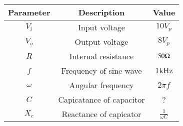  \begin{tabular}{|c|c|c|}
        \hline
        \textbf{Parameter} & \textbf{Description} & \textbf{Value} \\
        \hline
        $V_i$ & Input voltage & $10V_p$  \\ \hline
        $V_o$ & Output voltage & $8V_p$ \\ \hline
        $R$ &Internal resistance & $50 \ohm$ \\ \hline
        $f$ &Frequency of sine wave & $1\text{kHz}$ \\ \hline
        $\omega$ &Angular frequency & $2\pi f$ \\ \hline
        $C$ & Capicatance of capacitor & ? \\ \hline
        $X_c$ & Reactance of capicator & $\frac{1}{\omega C}$ \\ \hline
        
    \end{tabular}

